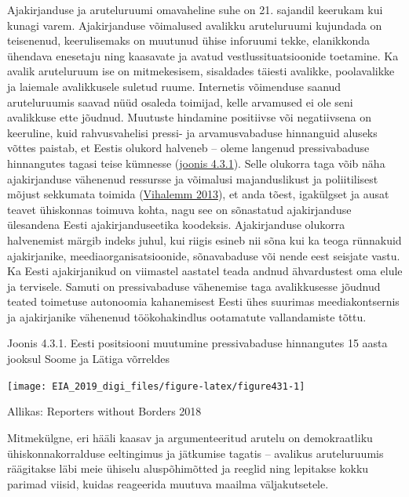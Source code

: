 \documentclass[estonian,]{article}
\begin{document}
Ajakirjanduse ja aruteluruumi omavaheline suhe on 21. sajandil keerukam kui kunagi varem. Ajakirjanduse võimalused avalikku aruteluruumi kujundada on teisenenud, keerulisemaks on muutunud ühise inforuumi tekke, elanikkonda ühendava enesetaju ning kaasavate ja avatud vestlussituatsioonide toetamine. Ka avalik aruteluruum ise on mitmekesisem, sisaldades täiesti avalikke, poolavalikke ja laiemale avalikkusele suletud ruume. Internetis võimenduse saanud aruteluruumis saavad nüüd osaleda toimijad, kelle arvamused ei ole seni avalikkuse ette jõudnud. Muutuste hindamine positiivse või negatiivsena on keeruline, kuid rahvusvahelisi pressi- ja arvamusvabaduse hinnanguid aluseks võttes paistab, et Eestis olukord halveneb -- oleme langenud pressivabaduse hinnangutes tagasi teise kümnesse (\protect\hyperlink{figure431}{joonis 4.3.1}). Selle olukorra taga võib näha ajakirjanduse vähenenud ressursse ja võimalusi majanduslikust ja poliitilisest mõjust sekkumata toimida (\protect\hyperlink{Vihalemm2013}{Vihalemm 2013}), et anda tõest, igakülgset ja ausat teavet ühiskonnas toimuva kohta, nagu see on sõnastatud ajakirjanduse ülesandena Eesti ajakirjanduseetika koodeksis. Ajakirjanduse olukorra halvenemist märgib indeks juhul, kui riigis esineb nii sõna kui ka teoga rünnakuid ajakirjanike, meediaorganisatsioonide, sõnavabaduse või nende eest seisjate vastu. Ka Eesti ajakirjanikud on viimastel aastatel teada andnud ähvardustest oma elule ja tervisele. Samuti on pressivabaduse vähenemise taga avalikkusesse jõudnud teated toimetuse autonoomia kahanemisest Eesti ühes suurimas meediakontsernis ja ajakirjanike vähenenud töökohakindlus ootamatute vallandamiste tõttu.

{Joonis 4.3.1.} Eesti positsiooni muutumine pressivabaduse hinnangutes 15 aasta jooksul Soome ja Lätiga võrreldes

\begin{center}\texttt{[image: EIA\_2019\_digi\_files/figure-latex/figure431-1]} \end{center}

\begin{imgsource}
{Allikas:} Reporters without Borders 2018
\end{imgsource}

Mitmekülgne, eri hääli kaasav ja argumenteeritud arutelu on demokraatliku ühiskonnakorralduse eeltingimus ja jätkumise tagatis -- avalikus aruteluruumis räägitakse läbi meie ühiselu aluspõhimõtted ja reeglid ning lepitakse kokku parimad viisid, kuidas reageerida muutuva maailma väljakutsetele.
\end{document}
